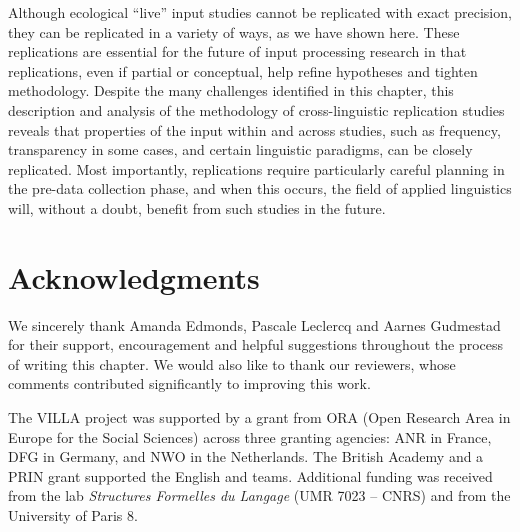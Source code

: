 \documentclass[output=paper,colorlinks,citecolor=brown,modfonts,nonflat]{../langscibook}
\begin{document}
Although ecological “live” input studies cannot be replicated with exact precision, they can be replicated in a variety of ways, as we have shown here. These replications are essential for the future of input processing research in that replications, even if partial or conceptual, help refine hypotheses and tighten methodology. Despite the many challenges identified in this chapter, this description and analysis of the methodology of cross-linguistic replication studies reveals that properties of the input within and across studies, such as frequency, transparency in some cases, and certain linguistic paradigms, can be closely replicated. Most importantly, replications require particularly careful planning in the pre-data collection phase, and when this occurs, the field of applied linguistics will, without a doubt, benefit from such studies in the future.

\section*{Acknowledgments}
We sincerely thank Amanda Edmonds, Pascale Leclercq and Aarnes Gudmestad for their support, encouragement and helpful suggestions throughout the process of writing this chapter. We would also like to thank our reviewers, whose comments contributed significantly to improving this work.

The VILLA project was supported by a grant from ORA (Open Research Area in Europe for the Social Sciences) across three granting agencies: ANR in France, DFG in Germany, and NWO in the Netherlands. The British Academy and a PRIN grant supported the English and  teams. Additional funding was received from the  lab \textit{Structures Formelles du Langage} (UMR 7023 – CNRS) and from the University of Paris 8.

{\sloppy\printbibliography[heading=subbibliography,notkeyword=this]}
\end{document}
